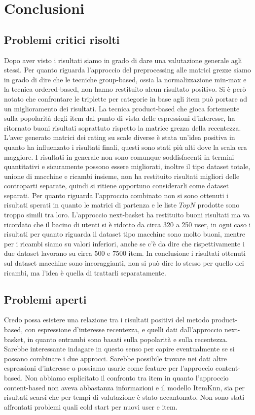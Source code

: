 \hypertarget{(chap:conclusioni)}{}
\chapter{Conclusioni}

\section{Problemi critici risolti}
Dopo aver visto i risultati siamo in grado di dare una valutazione generale agli stessi. Per quanto riguarda l'approccio del preprocessing alle matrici grezze siamo in grado di dire che le tecniche group-based, ossia la normalizzazione min-max e la tecnica ordered-based, non hanno restituito alcun risultato positivo. Si è però notato che confrontare le triplette per categorie in base agli item può portare ad un miglioramento dei risultati.
La tecnica product-based che gioca fortemente sulla popolarità degli item dal punto di vista delle espressioni d'interesse, ha ritornato buoni risultati soprattuto rispetto la matrice grezza della recentezza.\\
L'aver generato matrici dei rating su scale diverse è stata un'idea positiva in quanto ha influenzato i risultati finali, questi sono stati più alti dove la scala era maggiore.
I risultati in generale non sono comunque soddisfacenti in termini quantitativi e sicuramente possono essere migliorati, inoltre il tipo dataset totale, unione di macchine e ricambi insieme, non ha restituito risultati migliori delle controparti separate, quindi si ritiene opportuno considerarli come dataset separati. 
Per quanto riguarda l'approccio combinato non si sono ottenuti i risultati sperati in quanto le matrici di partenza e le liste $TopN$ prodotte sono troppo simili tra loro.
L'approccio next-basket ha restituito buoni risultati ma va ricordato che il bacino di utenti si è ridotto da circa 320 a 250 user, in ogni caso i risultati per quanto riguarda il dataset tipo macchine sono molto buoni, mentre per i ricambi siamo su valori inferiori, anche se c'è da dire che rispettivamente i due dataset lavorano su circa 500 e 7500 item.
In conclusione i risultati ottenuti sul dataset macchine sono incoraggianti, non si può dire lo stesso per quello dei ricambi, ma l'idea è quella di trattarli separatamente.

\section{Problemi aperti}
Credo possa esistere una relazione tra i risultati positivi del metodo product-based, con espressione d'interesse recentezza, e quelli dati dall'approccio next-basket, in quanto entrambi sono basati sulla popolarità e sulla recentezza. Sarebbe interessante indagare in questo senso per capire eventualmente se si possano combinare i due approcci. Sarebbe possibile trovare nei dati altre espressioni d'interesse o possiamo usarle come feature per l'approccio content-based. Non abbiamo esplicitato il confronto tra item in quanto l'approccio content-based non aveva abbastanza informazioni e il modello ItemKnn, sia per risultati scarsi che per tempi di valutazione è stato accantonato. Non sono stati affrontati problemi quali cold start per nuovi user e item.

